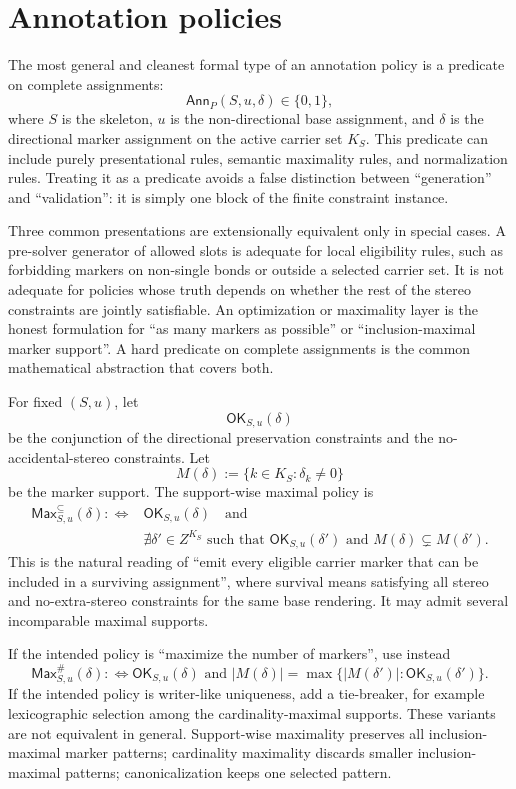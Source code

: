 \documentclass[10pt,a4paper]{article}
\newcommand{\Bool}{\{0,1\}}
\newcommand{\Ann}{\mathsf{Ann}}
\newcommand{\OK}{\mathsf{OK}}
\newcommand{\Max}{\mathsf{Max}}
\theoremstyle{definition}
\theoremstyle{remark}
\begin{document}
	\section{Annotation policies}
	\label{s:annotation-policy}

	The most general and cleanest formal type of an annotation policy is a predicate
	on complete assignments:
	\[
	\Ann_P(S,u,\delta)\in\Bool,
	\]
	where \(S\) is the skeleton, \(u\) is the non-directional base assignment, and
	\(\delta\) is the directional marker assignment on the active carrier set
	\(K_S\).  This predicate can include purely presentational rules, semantic
	maximality rules, and normalization rules.  Treating it as a predicate avoids a
	false distinction between ``generation'' and ``validation'': it is simply one
	block of the finite constraint instance.

	Three common presentations are extensionally equivalent only in special cases.
	A pre-solver generator of allowed slots is adequate for local eligibility rules,
	such as forbidding markers on non-single bonds or outside a selected carrier
	set.  It is not adequate for policies whose truth depends on whether the rest of
	the stereo constraints are jointly satisfiable.  An optimization or maximality
	layer is the honest formulation for ``as many markers as possible'' or
	``inclusion-maximal marker support''.  A hard predicate on complete assignments
	is the common mathematical abstraction that covers both.

	For fixed \((S,u)\), let
	\[
	\OK_{S,u}(\delta)
	\]
	be the conjunction of the directional preservation constraints and the
	no-accidental-stereo constraints.  Let
	\[
	M(\delta):=\{k\in K_S:\delta_k\ne0\}
	\]
	be the marker support.  The support-wise maximal policy is
	\[
	\begin{split}
		\Max^{\subseteq}_{S,u}(\delta)
		:\Longleftrightarrow{}&
		\OK_{S,u}(\delta)\quad\text{and}\quad\\
		&\nexists\delta'\in Z^{K_S}
		\text{ such that }
		\OK_{S,u}(\delta')
		\text{ and }
		M(\delta)\subsetneq M(\delta').
	\end{split}
	\]
	This is the natural reading of ``emit every eligible carrier marker that can be
	included in a surviving assignment'', where survival means satisfying all stereo
	and no-extra-stereo constraints for the same base rendering.  It may admit
	several incomparable maximal supports.

	If the intended policy is ``maximize the number of markers'', use instead
	\[
	\Max^{\#}_{S,u}(\delta)
	:\Longleftrightarrow
	\OK_{S,u}(\delta)
	\text{ and }
	|M(\delta)|=
	\max\{|M(\delta')|:\OK_{S,u}(\delta')\}.
	\]
	If the intended policy is writer-like uniqueness, add a tie-breaker, for example
	lexicographic selection among the cardinality-maximal supports.  These variants
	are not equivalent in general.  Support-wise maximality preserves all
	inclusion-maximal marker patterns; cardinality maximality discards smaller
	inclusion-maximal patterns; canonicalization keeps one selected pattern.
\end{document}

